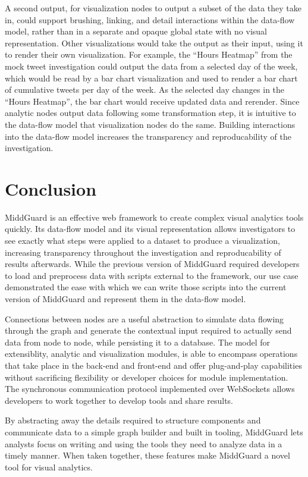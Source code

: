 \documentclass[midd]{thesis}
\begin{document}
A second output, for visualization nodes to output a subset of the data they
take in, could support brushing, linking, and detail interactions within the
data-flow model, rather than in a separate and opaque global state with no
visual representation. Other visualizations would take the output as their
input, using it to render their own visualization. For example, the ``Hours
Heatmap'' from the mock tweet investigation could output the data from a
selected  day of the week, which would be read by a bar chart visualization and
used to render a bar chart of cumulative tweets per day of the week. As the
selected day changes in the ``Hours Heatmap'', the bar chart would receive
updated data and rerender. Since analytic nodes output data following some
transformation step, it is intuitive to the data-flow model that visualization
nodes do the same. Building interactions into the data-flow model increases the
transparency and reproducability of the investigation.

\chapter{Conclusion}

MiddGuard is an effective web framework to create complex visual analytics tools
quickly. Its data-flow model and its visual representation allows investigators
to see exactly what steps were applied to a dataset to produce a visualization,
increasing transparency throughout the investigation and reproducability of
results afterwards. While the previous version of MiddGuard required developers
to load and preprocess data with scripts external to the framework, our use case
demonstrated the ease with which we can write those scripts into the current
version of MiddGuard and represent them in the data-flow model.

Connections between nodes are a useful abstraction to simulate data flowing
through the graph and generate the contextual input required to actually send
data from node to node, while persisting it to a database. The model for
extensiblity, analytic and visualization modules, is able to encompass
operations that take place in the back-end and front-end and offer plug-and-play
capabilities without sacrificing flexibility or developer choices for module
implementation. The synchronous communication protocol implemented over
WebSockets allows developers to work together to develop tools and share
results.

By abstracting away the details required to structure components and communicate
data to a simple graph builder and built in tooling, MiddGuard lets analysts
focus on writing and using the tools they need to analyze data in a timely
manner. When taken together, these features make MiddGuard a novel tool for
visual analytics.
\end{document}
